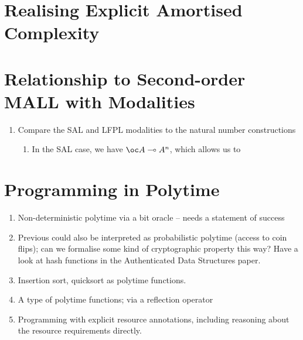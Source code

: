 \documentclass[acmsmall,review]{acmart}
\begin{document}
\section{Realising Explicit Amortised Complexity}
\label{sec:explicit-amortised-complexity}

\section{Relationship to Second-order MALL with Modalities}
\label{sec:poly-mall}

\begin{enumerate}
\item Compare the SAL and LFPL modalities to the natural number
  constructions
  \begin{enumerate}
  \item In the SAL case, we have $\oc A \multimap A^n$, which allows
    us to
  \end{enumerate}
\end{enumerate}



\section{Programming in Polytime}
\label{sec:programming-polytime}

\begin{enumerate}
\item Non-deterministic polytime via a bit oracle -- needs a statement
  of success
\item Previous could also be interpreted as probabilistic polytime
  (access to coin flips); can we formalise some kind of cryptographic
  property this way? Have a look at hash functions in the
  Authenticated Data Structures paper.
\item Insertion sort, quicksort as polytime functions.
\item A type of polytime functions; via a reflection operator
\item Programming with explicit resource annotations, including
  reasoning about the resource requirements directly.
\end{enumerate}
\end{document}
